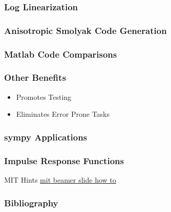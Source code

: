 \documentclass{beamer}
\begin{document}
\begin{frame}
  \frametitle{Log Linearization}
  
\end{frame}

\begin{frame}
  \frametitle{Anisotropic Smolyak Code Generation}
  
\end{frame}
\begin{frame}
  \frametitle{Matlab Code Comparisons}
  
\end{frame}

\begin{frame}
  \frametitle{Other Benefits}
  \begin{itemize}
  \item Promotes Testing
  \item Eliminates Error Prone Tasks
  \end{itemize}
\end{frame}

\begin{frame}
  \frametitle{sympy Applications}
  
\end{frame}

\begin{frame}
  \frametitle{Impulse Response Functions}
  
\end{frame}


\begin{frame}{MIT Hints}
  \href{http://web.mit.edu/rsi/www/pdfs/beamer-tutorial.pdf}{mit beamer slide how to}
\end{frame}

\begin{frame}
  \frametitle{Bibliography}
  



\end{frame}
\end{document}
